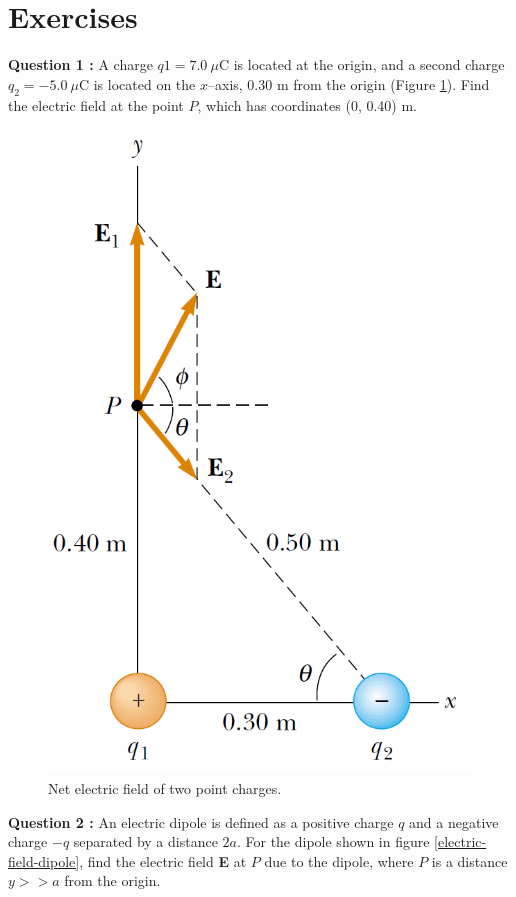 \documentclass[12pt,a4paper]{article}
\begin{document}
\section{Exercises}
\noindent\textbf{Question 1 \cite[Example 23.5, page 718]{Serway}:} A charge $q1=7.0~\mu$C is located at the origin, and a second charge $q_2=-5.0~\mu$C is located on the $x$--axis, 0.30 m from the origin (Figure \ref{electric-field-two-charges}). Find the electric field at the point $P$, which has coordinates (0, 0.40) m.
\begin{figure}[H]
\centering
\includegraphics[scale=0.45]{Figure23-14.png}
\caption{Net electric field of two point charges.}
\label{electric-field-two-charges}
\end{figure}
\newpage
\noindent\textbf{Question 2 \cite[Example 23.6, page 719]{Serway}:} An electric dipole is defined as a positive charge $q$ and a negative charge $-q$ separated by a distance $2a$. For the dipole shown in figure \ref{electric-field-dipole}, find the electric field \textbf{E} at $P$ due to the dipole, where $P$ is a distance $y >> a$ from the origin.
\end{document}
